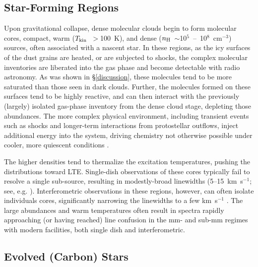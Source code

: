 \documentclass[twocolumn]{aastex631}
\begin{document}
\subsection{Star-Forming Regions}

Upon gravitational collapse, dense molecular clouds begin to form molecular cores, compact, warm ($T_{\rm{kin}}$~$>$100~K), and dense ($n_{\rm{H}}$~$\sim$10$^5$~--~10$^8$~cm$^{-3}$) sources, often associated with a nascent star.  In these regions, as the icy surfaces of the dust grains are heated, or are subjected to shocks, the complex molecular inventories are liberated into the gas phase and become detectable with radio astronomy. As was shown in \S\ref{discussion}, these molecules tend to be more saturated than those seen in dark clouds.  Further, the molecules formed on these surfaces tend to be highly reactive, and can then interact with the previously (largely) isolated gas-phase inventory from the dense cloud stage, depleting those abundances.  The more complex physical environment, including transient events such as shocks and longer-term interactions from protostellar outflows, inject additional energy into the system, driving chemistry not otherwise possible under cooler, more quiescent conditions \citep{Burkhardt:2016bs}.  

The higher densities tend to thermalize the excitation temperatures, pushing the distributions toward LTE.  Single-dish observations of these cores typically fail to resolve a single sub-source, resulting in modestly-broad linewidths (5--15~km~s$^{-1}$; see, e.g. \citealt{WidicusWeaver:2017hf}).  Interferometric observations in these regions, however, can often isolate individuals cores, significantly narrowing the linewidths to a few km~s$^{-1}$ \citep{Belloche:2016fm}.  The large abundances and warm temperatures often result in spectra rapidly approaching (or having reached) line confusion in the mm- and sub-mm regimes with modern facilities, both single dish and interferometric.

\subsection{Evolved (Carbon) Stars}
\end{document}
